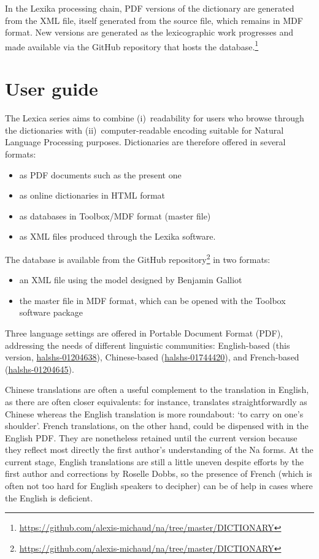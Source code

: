 In the Lexika processing chain, PDF versions of the dictionary are generated from the XML file, itself generated from the source file, which remains in MDF format. New versions are generated as the lexicographic work progresses and made available via the GitHub repository that hosts the database.\footnote{\url{https://github.com/alexis-michaud/na/tree/master/DICTIONARY}}


\section{User guide}
\label{sec:guide}

The Lexica series aims to combine (i)~readability for users who browse through the dictionaries with (ii)~computer-readable encoding suitable for Natural Language Processing purposes. Dictionaries are therefore offered in several formats:
\begin{itemize}
    \item as PDF documents such as the present one
    \item as online dictionaries in HTML format
    \item as databases in Toolbox/MDF format (master file)
    \item as XML files produced through the Lexika software.
\end{itemize}

The database is available from the GitHub repository\footnote{\url{https://github.com/alexis-michaud/na/tree/master/DICTIONARY}} in two formats:

\begin{itemize}
    \item an XML file using the model designed by Benjamin Galliot
    \item the master file in MDF format, which can be opened with the Toolbox software package
\end{itemize}

Three language settings are offered in Portable Document Format (PDF), addressing the needs of different linguistic communities: English-based (this version, \hyperlink{https://shs.hal.science/halshs-01204638}{halshs-01204638}), Chinese-based (\hyperlink{https://shs.hal.science/halshs-01744420}{halshs-01744420}), and French-based (\hyperlink{https://shs.hal.science/halshs-01204645/}{halshs-01204645}).

Chinese translations are often a useful complement to the translation in English, as there are often closer equivalents: for instance,  translates straightforwardly as Chinese  whereas the English translation is more roundabout: ‘to carry on one's shoulder’. French translations, on the other hand, could be dispensed with in the English PDF. They are nonetheless retained until the current version because they reflect most directly the first author's understanding of the Na forms. At the current stage, English translations are still a little uneven despite efforts by the first author and corrections by Roselle Dobbs, so the presence of French (which is often not too hard for English speakers to decipher) can be of help in cases where the English is deficient.

